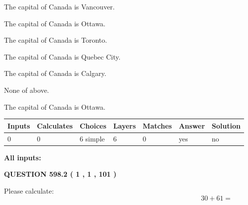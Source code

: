 \documentclass[12pt]{article}
\begin{document}
 
The capital of Canada is Vancouver.
 
 
The capital of Canada is Ottawa.
 
 
The capital of Canada is Toronto.
 
 
The capital of Canada is Quebec City.
 
 
The capital of Canada is Calgary.
 
 
 None of above.
 
 
\noindent{}
 
 
The capital of Canada is Ottawa.
 
 
\noindent{}
 
 
   
   
   
   
\noindent\begin{tabular}{|l|l|l|l|l|l|l|}
 \hline
Inputs & Calculates & Choices & Layers & Matches & Answer & Solution \\ \hline
 0  & 
 0  & 
 6
  simple  
  & 
 6  & 
 0  & 
  yes & 
  no 
  \\ \hline
 \end{tabular}
   
   
   
   
\noindent{}
   
   
   
   
\noindent\vspace{0.1in}\hspace{-0.08in} {\textbf{\Large{All inputs: }}}
   
   
  
\vspace{0.2in}
  
{\textbf{\Large{QUESTION
598.2 
 ( 1 , 1 , 101 )
}}}
  
  
 
Please calculate:
\begin{equation}
30 +  %
61 = \nonumber
\end{equation}
 
 
 
\noindent{}
 
\end{document}
